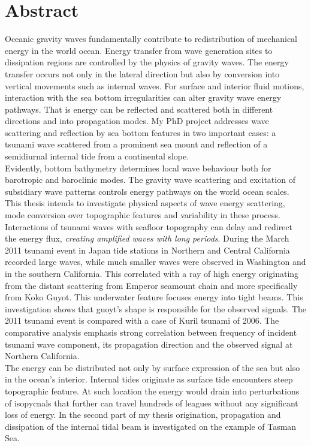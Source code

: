 \section{Abstract}
Oceanic gravity waves fundamentally contribute to redistribution of mechanical energy in the world ocean. Energy transfer from wave generation sites to dissipation regions are controlled by the physics of gravity waves. The energy transfer occurs not only in the lateral direction but also by conversion into vertical movements such as internal waves. For surface and interior fluid motions, interaction with the sea bottom irregularities can alter gravity wave energy pathways. That is energy can be reflected and scattered both in different directions and into propagation modes. My PhD project addresses wave scattering and reflection by sea bottom features in two important cases: a tsunami wave scattered from a prominent sea mount and reflection of a semidiurnal internal tide from a continental slope.\\
Evidently, bottom bathymetry determines local wave behaviour both for barotropic and baroclinic modes. The gravity wave scattering and excitation of subsidiary wave patterns controls energy pathways on the world ocean scales. This thesis intends to investigate physical aspects of wave energy scattering, mode conversion over topographic features and variability in these process.\\
Interactions of tsunami waves with seafloor topography can delay and redirect the energy flux, \textit{creating amplified waves with long periods}. During the March 2011 tsunami event in Japan tide stations in Northern and Central California recorded large waves, while much smaller waves were observed in Washington and in the southern California. This correlated with a ray of high energy originating from the distant scattering from Emperor seamount chain and more specifically from Koko Guyot. This underwater feature focuses energy into tight beams. This investigation shows that guoyt's shape is responsible for the observed signals. The 2011 tsunami event is compared with a case of Kuril tsunami of 2006. The comparative analysis emphasis strong correlation between frequency of incident tsunami wave component, its propagation direction and the observed signal at Northern California.\\
The energy can be distributed not only by surface expression of the sea but also in the ocean's interior. Internal tides originate as surface tide encounters steep topographic feature. At such location the energy would drain into perturbations of isopycnals that further can travel hundreds of  leagues without any significant loss of energy. In the second part of my thesis origination, propagation and dissipation of the internal tidal beam is investigated on the example of Tasman Sea. 
